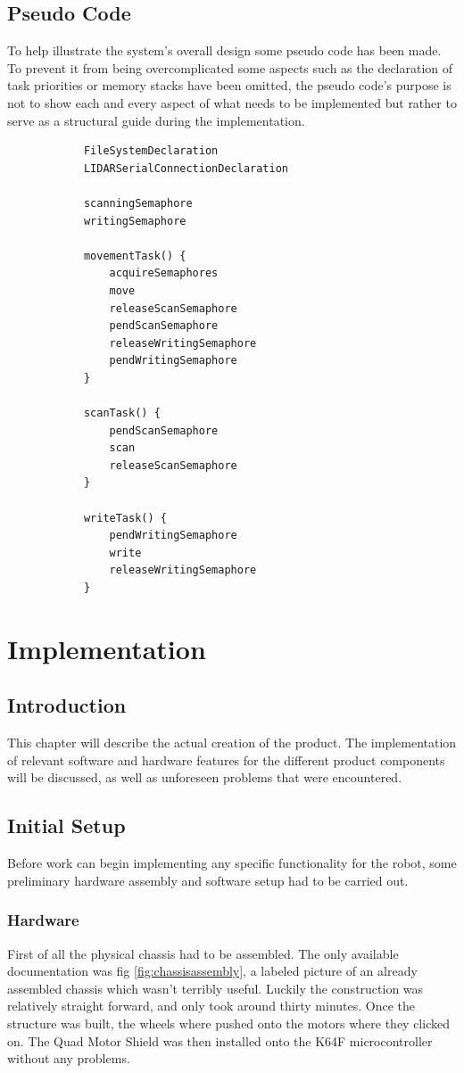 		\section{Pseudo Code}
		To help illustrate the system's overall design some pseudo code has been made. To prevent it from being overcomplicated some aspects such as the declaration of task priorities or memory stacks have been omitted, the pseudo code's purpose is not to show each and every aspect of what needs to be implemented but rather to serve as a structural guide during the implementation.
		\begin{lstlisting}
			FileSystemDeclaration
			LIDARSerialConnectionDeclaration		
			
			scanningSemaphore
			writingSemaphore
			
			movementTask() {
				acquireSemaphores
				move
				releaseScanSemaphore
				pendScanSemaphore
				releaseWritingSemaphore
				pendWritingSemaphore
			}
			
			scanTask() {
				pendScanSemaphore
				scan
				releaseScanSemaphore
			}
			
			writeTask() {
				pendWritingSemaphore
				write
				releaseWritingSemaphore
			}
		\end{lstlisting}
		
	\chapter{Implementation}
		\section{Introduction}
		This chapter will describe the actual creation of the product. The implementation of relevant software and hardware features for the different product components will be discussed, as well as unforeseen problems that were encountered.
		
		\section{Initial Setup}
		Before work can begin implementing any specific functionality for the robot, some preliminary hardware assembly and software setup had to be carried out.
			
			\subsection{Hardware}
			First of all the physical chassis had to be assembled. The only available documentation was fig \ref{fig:chassisassembly}, a labeled picture of an already assembled chassis which wasn't terribly useful. Luckily the construction was relatively straight forward, and only took around thirty minutes. Once the structure was built, the wheels where pushed onto the motors where they clicked on. The Quad Motor Shield was then installed onto the K64F microcontroller without any problems.
				
